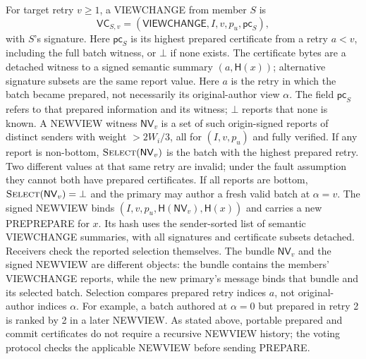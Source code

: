 \documentclass[11pt,a4paper,onecolumn]{article}
\newcommand{\Hash}{\mathsf H}
\newcommand{\NV}{\mathsf{NV}}
\newcommand{\botv}{\bot}
\newcommand{\Tag}[1]{\mathsf{#1}}
\newcommand{\Proc}[1]{\textnormal{\textsc{#1}}}
\theoremstyle{remark}\newtheorem{example}[definition]{Example}
\newcounter{protocol}
\begin{document}
For target retry $v\geq1$, a VIEWCHANGE from member $S$ is
\[
 \mathsf{VC}_{S,v}=(\Tag{VIEWCHANGE},I,v,p_u,\mathsf{pc}_S),
\]
with $S$'s signature. Here $\mathsf{pc}_S$ is its highest prepared certificate
from a retry $a<v$, including the full batch witness, or $\botv$ if none exists.
The certificate bytes are a detached witness to a signed semantic summary
$(a,\Hash(x))$; alternative signature subsets are the same report value.
Here $a$ is the retry in which the batch became prepared, not necessarily
its original-author view $\alpha$. The field $\mathsf{pc}_S$ refers to that
prepared information and its witness; $\botv$ reports that none is known.
A NEWVIEW witness $\NV_v$ is a set of such origin-signed reports of distinct
senders with weight $>2W_i/3$, all for $(I,v,p_u)$ and fully verified.
If any report is non-bottom, $\Proc{Select}(\NV_v)$ is the batch with the
highest prepared retry. Two different values at that same retry are invalid;
under the fault assumption they cannot both have prepared certificates.
If all reports are bottom, $\Proc{Select}(\NV_v)=\botv$ and the primary may
author a fresh valid batch at $\alpha=v$.
The signed NEWVIEW binds $(I,v,p_u,\Hash(\NV_v),\Hash(x))$ and carries a new
PREPREPARE for $x$. Its hash uses the sender-sorted list of semantic
VIEWCHANGE summaries, with all signatures and certificate subsets detached.
Receivers check the reported selection themselves.
The bundle $\NV_v$ and the signed NEWVIEW are different objects: the bundle
contains the members' VIEWCHANGE reports, while the new primary's message
binds that bundle and its selected batch. Selection compares prepared retry
indices $a$, not original-author indices $\alpha$. For example, a batch
authored at $\alpha=0$ but prepared in retry 2 is ranked by 2 in a later
NEWVIEW. As stated above, portable prepared and commit certificates do not
require a recursive NEWVIEW history; the voting protocol checks the applicable
NEWVIEW before sending PREPARE.
\end{document}
